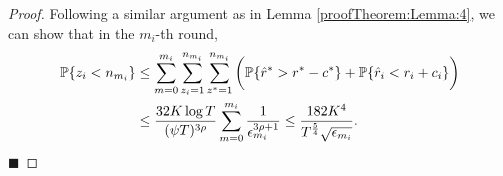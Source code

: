 \begin{proof}
Following a similar argument as in Lemma \ref{proofTheorem:Lemma:4}, we can show that in the $m_i$-th round,
\begin{align*}
\mathbb{P}\lbrace z_i < n_{m_i} \rbrace &\leq \sum_{m=0}^{m_i}\sum_{z_i =1}^{n_{m_i}}\sum_{z^* =1}^{n_{m_i}}\bigg(\mathbb{P}\lbrace \hat{r}^* > r^* - c^{*}\rbrace + \mathbb{P}\lbrace \hat{r}_i < r_i + c_i\rbrace\bigg) \\
&\leq \dfrac{32K\log T}{(\psi T)^{3\rho}}\sum_{m=0}^{m_i}\dfrac{1}{\epsilon_{m_i}^{3\rho + 1}}\leq \dfrac{182 K^4}{T^{\frac{5}{4}}\sqrt{\epsilon_{m_i}}}.
\end{align*}
\hfill $\blacksquare$	
\end{proof}

%
%
